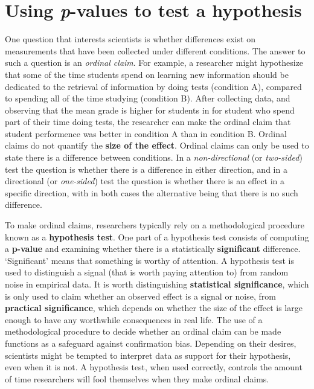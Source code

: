 \documentclass[
]{krantz}
\begin{document}
\hypertarget{pvalue}{%
\chapter{\texorpdfstring{Using \emph{p}-values to test a hypothesis}{Using p-values to test a hypothesis}}\label{pvalue}}

One question that interests scientists is whether differences exist on measurements that have been collected under different conditions. The answer to such a question is an \emph{ordinal claim}. For example, a researcher might hypothesize that some of the time students spend on learning new information should be dedicated to the retrieval of information by doing tests (condition A), compared to spending all of the time studying (condition B). After collecting data, and observing that the mean grade is higher for students in for student who spend part of their time doing tests, the researcher can make the ordinal claim that student performence was better in condition A than in condition B. Ordinal claims do not quantify the \textbf{size of the effect}. Ordinal claims can only be used to state there is a difference between conditions. In a \emph{non-directional} (or \emph{two-sided}) test the question is whether there is a difference in either direction, and in a directional (or \emph{one-sided}) test the question is whether there is an effect in a specific direction, with in both cases the alternative being that there is no such difference.

To make ordinal claims, researchers typically rely on a methodological procedure known as a \textbf{hypothesis test}. One part of a hypothesis test consists of computing a \textbf{p-value} and examining whether there is a statistically \textbf{significant} difference. `Significant' means that something is worthy of attention. A hypothesis test is used to distinguish a signal (that is worth paying attention to) from random noise in empirical data. It is worth distinguishing \textbf{statistical significance}, which is only used to claim whether an observed effect is a signal or noise, from \textbf{practical significance}, which depends on whether the size of the effect is large enough to have any worthwhile consequences in real life. The use of a methodological procedure to decide whether an ordinal claim can be made functions as a safeguard against confirmation bias. Depending on their desires, scientists might be tempted to interpret data as support for their hypothesis, even when it is not. A hypothesis test, when used correctly, controls the amount of time researchers will fool themselves when they make ordinal claims.
\end{document}
